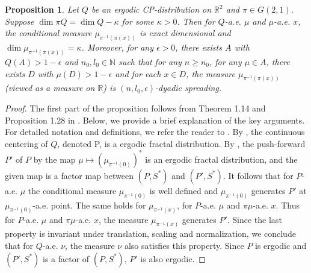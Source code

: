 \documentclass[a4paper,11pt]{amsart}
\newtheorem{proposition}[theorem]{Proposition}
\theoremstyle{definition}
\numberwithin{equation}{section}
\def\N{\mathbb N}
\def\R{\mathbb R}
\begin{document}
\begin{proposition}\label{prop:slice-cp-distribution:1}
Let $Q$ be an ergodic  CP-distribution on $\R^2$ and $\pi\in G(2,1)$.  Suppose $\dim \pi Q = \dim Q-\kappa$ for some $\kappa>0$. Then for $Q$-a.e.  $\mu$ and $\mu$-a.e.  $x$, the conditional measure $\mu_{\pi^{-1}(\pi(x))}$ is exact dimensional and $\dim \mu_{\pi^{-1}(\pi(x))}=\kappa$.  Moreover,  for any $\epsilon>0$, there exists $A$ with $Q(A)>1-\epsilon$ and $n_0,l_0\in \N$ such that for any $n\ge n_0$, for any $\mu\in A$, there exists $D$  with $\mu(D)>1-\epsilon$ and for each $x\in D$, the measure $\mu_{\pi^{-1}(\pi(x))}$ (viewed as a measure on $\R$) is $(n,l_0,\epsilon)$-dyadic spreading.
\end{proposition}
\begin{proof}
The first part of the proposition follows from Theorem 1.14 and Proposition 1.28 in \cite{Hochman2010-fractal-distributions}. Below, we provide a brief explanation of the key arguments. For detailed notation and definitions, we refer the reader to \cite{Hochman2010-fractal-distributions}.  By \cite[Theorem 1.14]{Hochman2010-fractal-distributions}, the continuous centering of $Q$, denoted P, is a ergodic fractal distribution. By \cite[Proposition 1.28]{Hochman2010-fractal-distributions}, the push-forward $P'$ of $P$ by the map $\mu\mapsto \left( \mu_{\pi^{-1}(0)} \right)^*$ is an ergodic fractal distribution, and the given map is a factor map between $(P,S^*)$ and $(P',S^*)$.   It follows that for $P$-a.e.  $\mu$ the conditional measure $\mu_{\pi^{-1}(0)}$ is well defined and $\mu_{\pi^{-1}(0)}$ generates $P'$ at $\mu_{\pi^{-1}(0)}$-a.e.  point.  The same holds for $\mu_{\pi^{-1}(x)}$,  for $P$-a.e. $\mu$ and $\pi\mu$-a.e. $x$. Thus for $P$-a.e.  $\mu$ and $\pi\mu$-a.e. $x$,  the measure $\mu_{\pi^{-1}(x)}$ generates $P'$.  Since the last property is invariant under translation, scaling and normalization, we conclude that for $Q$-a.e.  $\nu$, the measure $\nu$ also satisfies this property.     Since $P$ is ergodic and $(P',S^*)$  is a factor of $(P,S^*)$,  $P'$ is also ergodic.  



\end{proof}
\end{document}
